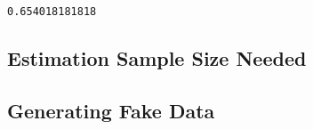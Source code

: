 \documentclass{article}
\newlength{\cellleftmargin}
\newlength{\smallerfontscale}
\def\smaller{\fontsize{\smallerfontscale}{\smallerfontscale}\selectfont}
\begin{document}
\par\vspace{1\smallerfontscale}%
    \begin{addmargin}[\cellleftmargin]{0em}%
    {\smaller%
    \vspace{-1\smallerfontscale}%
    
    \begin{Verbatim}[commandchars=\\\{\}]
0.654018181818
    \end{Verbatim}
}%
    \end{addmargin}%
    \subsection{Estimation Sample Size
Needed}\label{estimation-sample-size-needed}

\newpage

    \subsection{Generating Fake Data}\label{generating-fake-data}

\end{document}
